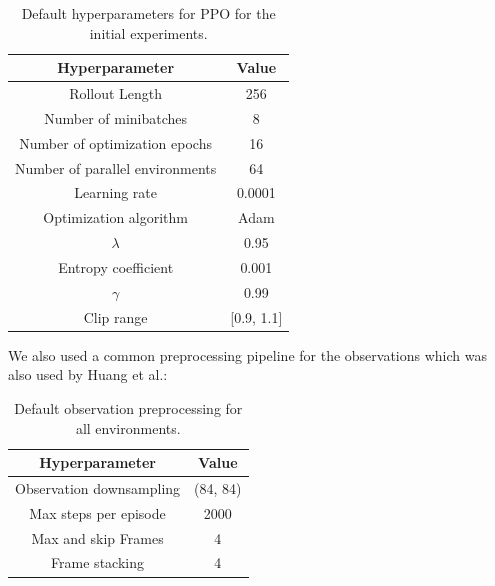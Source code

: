 \begin{table} [ht]
    \begin{center}
        \begin{tabular}{|c|c|}
            \hline
            Hyperparameter & Value \\
            \hline
            Rollout Length & 256 \\
            Number of minibatches & 8 \\
            Number of optimization epochs & 16 \\
            Number of parallel environments & 64 \\
            Learning rate & 0.0001 \\
            Optimization algorithm & Adam \cite{kingma2014adam} \\
            $\lambda$ & 0.95 \\
            Entropy coefficient & 0.001 \\
            $\gamma$ & 0.99 \\
            Clip range & [0.9, 1.1] \\
            \hline
        \end{tabular}
    \end{center}
    \caption[Default Hyperparameters]{Default hyperparameters for PPO for the initial experiments.} \label{tab:RNDParameters}
\end{table}

We also used a common preprocessing pipeline for the observations which was also used by Huang et al.:

\begin{table} [h]
    \begin{center}
        \begin{tabular}{|c|c|}
            \hline
            Hyperparameter & Value \\
            \hline
            Observation downsampling & (84, 84) \\
            Max steps per episode & 2000 \\
            Max and skip Frames & 4 \\
            Frame stacking & 4 \\
            \hline
        \end{tabular}
    \end{center}
    \caption[Default Observation Preprocessing]{Default observation preprocessing for all environments.} \label{tab:RNDParameters}
\end{table}

